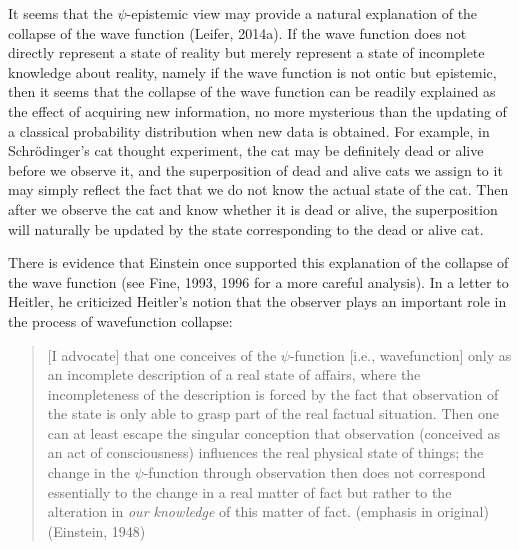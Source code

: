 It seems that the $\psi$-epistemic view may provide a natural explanation of the collapse of the wave function (Leifer, 2014a). If the wave function does not directly represent a state of reality but merely represent a state of incomplete knowledge about reality, namely if the wave function is not ontic but epistemic, then it seems that the collapse of the wave function can be readily explained as the effect of acquiring new information, no more mysterious than the updating of a classical probability distribution when new data is obtained. 
For example, in Schr\"{o}dinger's cat thought experiment, the cat may be definitely dead or alive before we observe it, and the superposition of dead and alive cats we assign to it may simply reflect the fact that we do not know the actual state of the cat. Then after we observe the cat and know whether it is dead or alive, the superposition will naturally be updated by the state corresponding to the dead or alive cat. 



There is evidence that Einstein once supported this explanation of the collapse of the wave function (see Fine, 1993, 1996 for a more careful analysis). In a letter to Heitler, he criticized Heitler's notion that the observer plays an important role in the process of wavefunction collapse:

\begin{quote}
[I advocate] that one conceives of the $\psi$-function [i.e., wavefunction] only as an incomplete description of a real state of affairs, where the incompleteness of the description is forced by the fact that observation of the state is only able to grasp part of the real factual situation. Then one can at least escape the singular conception that observation (conceived as an act of consciousness) influences the real physical state of things; the change in the $\psi$-function through observation then does not correspond essentially to the change in a real matter of fact but rather to the alteration in \emph{our knowledge} of this matter of fact. (emphasis in original) (Einstein, 1948)
\end{quote}

